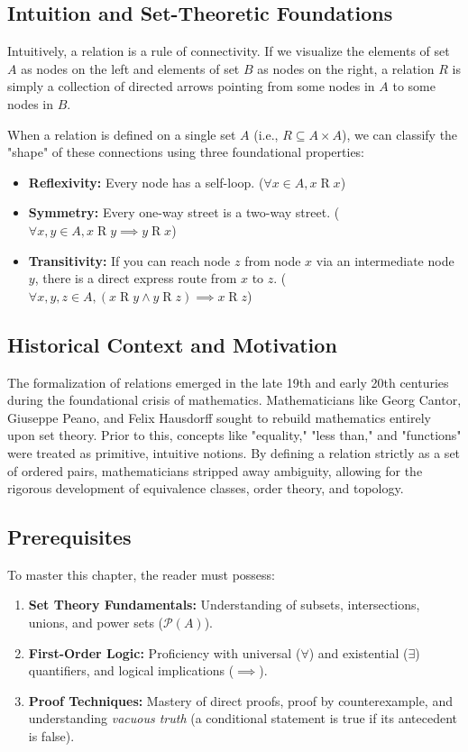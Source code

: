 \documentclass[11pt, a4paper]{article}
\theoremstyle{definition}
\theoremstyle{remark}
\begin{document}
\subsection{Intuition and Set-Theoretic Foundations}
Intuitively, a relation is a rule of connectivity. If we visualize the elements of set $A$ as nodes on the left and elements of set $B$ as nodes on the right, a relation $R$ is simply a collection of directed arrows pointing from some nodes in $A$ to some nodes in $B$. 

When a relation is defined on a single set $A$ (i.e., $R \subseteq A \times A$), we can classify the "shape" of these connections using three foundational properties:
\begin{itemize}
    \item \textbf{Reflexivity:} Every node has a self-loop. ($\forall x \in A, x \mathrel{R} x$)
    \item \textbf{Symmetry:} Every one-way street is a two-way street. ($\forall x, y \in A, x \mathrel{R} y \implies y \mathrel{R} x$)
    \item \textbf{Transitivity:} If you can reach node $z$ from node $x$ via an intermediate node $y$, there is a direct express route from $x$ to $z$. ($\forall x, y, z \in A, (x \mathrel{R} y \land y \mathrel{R} z) \implies x \mathrel{R} z$)
\end{itemize}

\subsection{Historical Context and Motivation}
The formalization of relations emerged in the late 19th and early 20th centuries during the foundational crisis of mathematics. Mathematicians like Georg Cantor, Giuseppe Peano, and Felix Hausdorff sought to rebuild mathematics entirely upon set theory. Prior to this, concepts like "equality," "less than," and "functions" were treated as primitive, intuitive notions. By defining a relation strictly as a set of ordered pairs, mathematicians stripped away ambiguity, allowing for the rigorous development of equivalence classes, order theory, and topology.

\subsection{Prerequisites}
To master this chapter, the reader must possess:
\begin{enumerate}
    \item \textbf{Set Theory Fundamentals:} Understanding of subsets, intersections, unions, and power sets ($\mathcal{P}(A)$).
    \item \textbf{First-Order Logic:} Proficiency with universal ($\forall$) and existential ($\exists$) quantifiers, and logical implications ($\implies$).
    \item \textbf{Proof Techniques:} Mastery of direct proofs, proof by counterexample, and understanding \textit{vacuous truth} (a conditional statement is true if its antecedent is false).
\end{enumerate}
\end{document}
